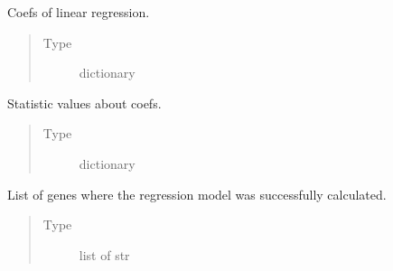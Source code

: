 \documentclass[letterpaper,10pt,english]{sphinxmanual}
\begin{document}
\begin{fulllineitems}
\begin{fulllineitems}
\end{fulllineitems}


\begin{fulllineitems}
\label{\detokenize{modules/celloracle:celloracle.Net.coefs_dict}}
Coefs of linear regression.
\begin{quote}\begin{description}
\item[{Type}] \leavevmode
dictionary

\end{description}\end{quote}

\end{fulllineitems}


\begin{fulllineitems}
\label{\detokenize{modules/celloracle:celloracle.Net.stats_dict}}
Statistic values about coefs.
\begin{quote}\begin{description}
\item[{Type}] \leavevmode
dictionary

\end{description}\end{quote}

\end{fulllineitems}


\begin{fulllineitems}
\label{\detokenize{modules/celloracle:celloracle.Net.fitted_genes}}
List of genes where the regression model was successfully calculated.
\begin{quote}\begin{description}
\item[{Type}] \leavevmode
list of str

\end{description}\end{quote}


\end{fulllineitems}
\end{fulllineitems}
\end{document}
